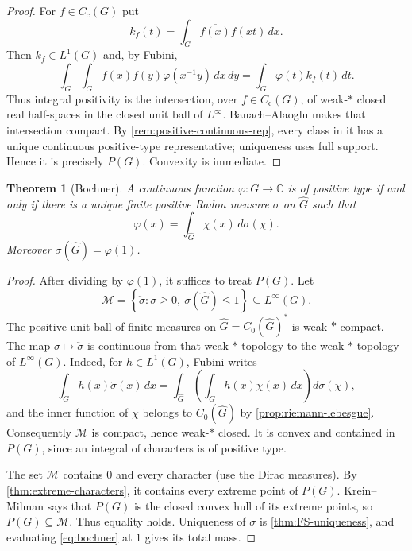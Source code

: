 \documentclass[11pt]{article}
\newtheorem{theorem}{Theorem}[section]
\theoremstyle{definition}
\theoremstyle{remark}
\newcommand{\C}{\mathbb C}
\newcommand{\Cc}{C_{\mathrm c}}
\newcommand{\Czero}{C_0}
\newcommand{\Lp}[1]{L^{#1}}
\newcommand{\dual}[1]{\widehat{#1}}
\newcommand{\set}[1]{\left\{#1\right\}}
\begin{document}
\begin{proof}
For $f\in\Cc(G)$ put
\[
 k_f(t)=\int_G\overline{f(x)}f(xt)\,dx.
\]
Then $k_f\in\Lp1(G)$ and, by Fubini,
\[
 \int_G\int_G\overline{f(x)}f(y)\varphi(x^{-1}y)\,dx\,dy
 =\int_G\varphi(t)k_f(t)\,dt.
\]
Thus integral positivity is the intersection, over $f\in\Cc(G)$, of weak-$*$ closed
real half-spaces in the closed unit ball of $\Lp\infty$.  Banach--Alaoglu makes that
intersection compact.  By \cref{rem:positive-continuous-rep}, every class in it has a
unique continuous positive-type representative; uniqueness uses full support.  Hence it
is precisely $P(G)$.  Convexity is immediate.
\end{proof}

\begin{theorem}[Bochner]
\label{thm:bochner}
A continuous function $\varphi:G\to\C$ is of positive type if and only if there is a
unique finite positive Radon measure $\sigma$ on $\dual G$ such that
\begin{equation}
  \varphi(x)=\int_{\dual G}\chi(x)\,d\sigma(\chi).
  \label{eq:bochner}
\end{equation}
Moreover $\sigma(\dual G)=\varphi(1)$.
\end{theorem}

\begin{proof}
After dividing by $\varphi(1)$, it suffices to treat $P(G)$.  Let
\[
 \mathcal M=\set{\check\sigma:
   \sigma\geq0,\ \sigma(\dual G)\leq1}\subseteq\Lp\infty(G).
\]
The positive unit ball of finite measures on $\dual G=\Czero(\dual G)^*$ is weak-$*$
compact.  The map $\sigma\mapsto\check\sigma$ is continuous from that weak-$*$ topology
to the weak-$*$ topology of $\Lp\infty(G)$.  Indeed, for $h\in\Lp1(G)$, Fubini writes
\[
 \int_Gh(x)\check\sigma(x)\,dx
 =\int_{\dual G}\left(\int_Gh(x)\chi(x)\,dx\right)d\sigma(\chi),
\]
and the inner function of $\chi$ belongs to $\Czero(\dual G)$ by
\cref{prop:riemann-lebesgue}.  Consequently $\mathcal M$ is compact, hence weak-$*$
closed.  It is convex and contained in $P(G)$, since an integral of characters is of
positive type.

The set $\mathcal M$ contains $0$ and every character (use the Dirac measures).
By \cref{thm:extreme-characters}, it contains every extreme point of $P(G)$.
Krein--Milman says that $P(G)$ is the closed convex hull of its extreme points, so
$P(G)\subseteq\mathcal M$.  Thus equality holds.  Uniqueness of $\sigma$ is
\cref{thm:FS-uniqueness}, and evaluating \eqref{eq:bochner} at $1$ gives its total mass.
\end{proof}
\end{document}
